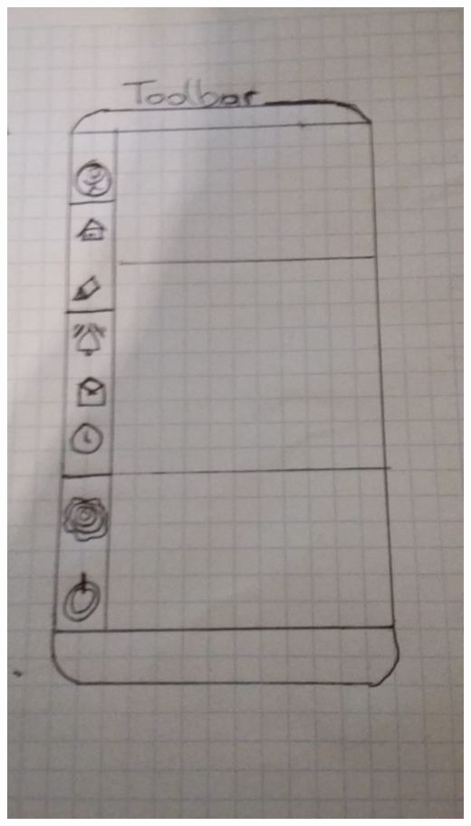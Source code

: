 \documentclass[12pt]{article}
\theoremstyle{definition}
\begin{document}
\includegraphics[scale=.2]{Gui/toolbar.jpeg} 
\end{document}

